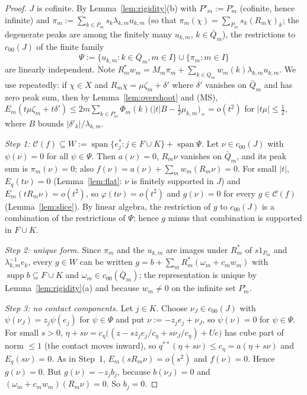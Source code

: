 \documentclass[10pt]{amsart}
\theoremstyle{definition}
\theoremstyle{remark}
\newcommand{\supp}{\operatorname{supp}}
\newcommand{\spn}{\operatorname{span}}
\newcommand{\Cset}{\mathcal C}
\begin{document}
\begin{proof}
$J$ is cofinite.  By Lemma~\ref{lem:rigidity}(b) with $P'_m:=P^\circ_m$
(cofinite, hence infinite) and $\pi_m:=\sum_{k\in P_m}s_k\lambda_{k,m}
u_{k,m}$ (so that $\pi_m(\chi)=\sum_{P_m}s_k(R_m\chi)_k$; the degenerate
peaks are among the finitely many $u_{k,m}$, $k\in\bar Q_m$), the
restrictions to $c_{00}(J)$ of the finite family
\[
 \Psi:=\{u_{k,m}:k\in\bar Q_m,m\in I\}\cup\{\pi_m:m\in I\}
\]
are linearly independent.  Note $R_m^*w_m=M_m\pi_m+\sum_{k\in
Q_m}w_m(k)\lambda_{k,m}u_{k,m}$.  We use repeatedly: if $\chi\in X$ and
$R_m\chi=\mu\zeta_m+\delta'$ where $\delta'$ vanishes on $\bar Q_m$ and
has zero peak sum, then by Lemma~\ref{lem:overshoot} and \textup{(MS)},
$E_m(t\mu\zeta_m+t\delta')\le2m\sum_{k\in P^\circ_m}\Phi_m(k)\big(|t|B-
\tfrac12\mu_{k,m}\big)_+=o(t^2)$ for $|t\mu|\le\frac12$, where $B$ bounds
$|\delta'_k|/\lambda_{k,m}$.

\emph{Step 1: $\Cset(f)\subseteq W:=\spn\{e_j^*:j\in F\cup K\}+\spn\Psi$.}
Let $\nu\in c_{00}(J)$ with $\psi(\nu)=0$ for all $\psi\in\Psi$.  Then
$a(\nu)=0$, $R_m\nu$ vanishes on $\bar Q_m$, and its peak sum is
$\pi_m(\nu)=0$; also $f(\nu)=a(\nu)+\sum_mw_m(R_m\nu)=0$.  For small $|t|$,
$E_q(t\nu)=0$ (Lemma~\ref{lem:flat}: $\nu$ is finitely supported in $J$) and
$E_m(tR_m\nu)=o(t^2)$, so $\varphi(t\nu)=o(t^2)$ and $g(\nu)=0$ for every
$g\in\Cset(f)$ (Lemma~\ref{lem:slice}).  By linear algebra, the restriction
of $g$ to $c_{00}(J)$ is a combination of the restrictions of $\Psi$; hence
$g$ minus that combination is supported in $F\cup K$.

\emph{Step 2: unique form.}  Since $\pi_m$ and the $u_{k,m}$ are images
under $R_m^*$ of $s1_{P_m}$ and $\lambda_{k,m}^{-1}e_k$, every $g\in W$ can
be written $g=b+\sum_mR_m^*(\omega_m+c_mw_m)$ with $\supp b\subseteq F\cup
K$ and $\omega_m\in c_{00}(\bar Q_m)$; the representation is unique by
Lemma~\ref{lem:rigidity}(a) and because $w_m\ne0$ on the infinite set
$P_m^\circ$.

\emph{Step 3: no contact components.}  Let $j\in K$.  Choose
$\nu_J\in c_{00}(J)$ with $\psi(\nu_J)=z_j\psi(e_j)$ for $\psi\in\Psi$ and
put $\nu:=-z_je_j+\nu_J$, so $\psi(\nu)=0$ for $\psi\in\Psi$.  For small
$s>0$, $\eta+s\nu=c_\eta\big((z-sz_je_j/c_\eta+s\nu_J/c_\eta)+Ue\big)$ has
cube part of norm $\le1$ (the contact moves inward), so
$q^{**}(\eta+s\nu)\le c_\eta=a(\eta+s\nu)$ and $E_q(s\nu)=0$.  As in
Step~1, $E_m(sR_m\nu)=o(s^2)$ and $f(\nu)=0$.  Hence $g(\nu)=0$.  But
$g(\nu)=-z_jb_j$, because $b(\nu_J)=0$ and
$(\omega_m+c_mw_m)(R_m\nu)=0$.  So $b_j=0$.


\end{proof}
\end{document}
